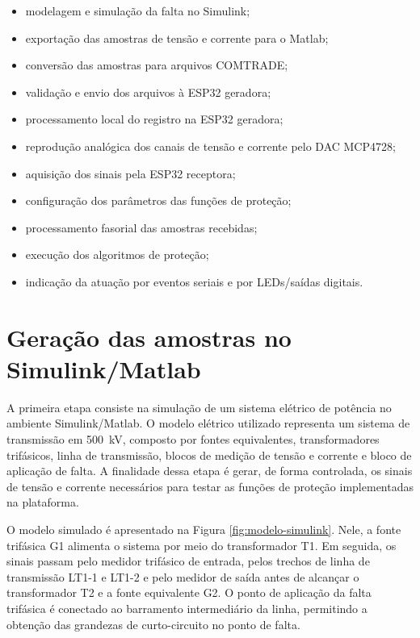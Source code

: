 \begin{itemize}
  \item modelagem e simulação da falta no Simulink;
  \item exportação das amostras de tensão e corrente para o Matlab;
  \item conversão das amostras para arquivos COMTRADE;
  \item validação e envio dos arquivos à ESP32 geradora;
  \item processamento local do registro na ESP32 geradora;
  \item reprodução analógica dos canais de tensão e corrente pelo DAC MCP4728;
  \item aquisição dos sinais pela ESP32 receptora;
  \item configuração dos parâmetros das funções de proteção;
  \item processamento fasorial das amostras recebidas;
  \item execução dos algoritmos de proteção;
  \item indicação da atuação por eventos seriais e por LEDs/saídas digitais.
\end{itemize}

\section{Geração das amostras no Simulink/Matlab}

A primeira etapa consiste na simulação de um sistema elétrico de potência no ambiente Simulink/Matlab. O modelo elétrico utilizado representa um sistema de transmissão em \SI{500}{\kilo\volt}, composto por fontes equivalentes, transformadores trifásicos, linha de transmissão, blocos de medição de tensão e corrente e bloco de aplicação de falta. A finalidade dessa etapa é gerar, de forma controlada, os sinais de tensão e corrente necessários para testar as funções de proteção implementadas na plataforma.

O modelo simulado é apresentado na Figura \ref{fig:modelo-simulink}. Nele, a fonte trifásica G1 alimenta o sistema por meio do transformador T1. Em seguida, os sinais passam pelo medidor trifásico de entrada, pelos trechos de linha de transmissão LT1-1 e LT1-2 e pelo medidor de saída antes de alcançar o transformador T2 e a fonte equivalente G2. O ponto de aplicação da falta trifásica é conectado ao barramento intermediário da linha, permitindo a obtenção das grandezas de curto-circuito no ponto de falta.

